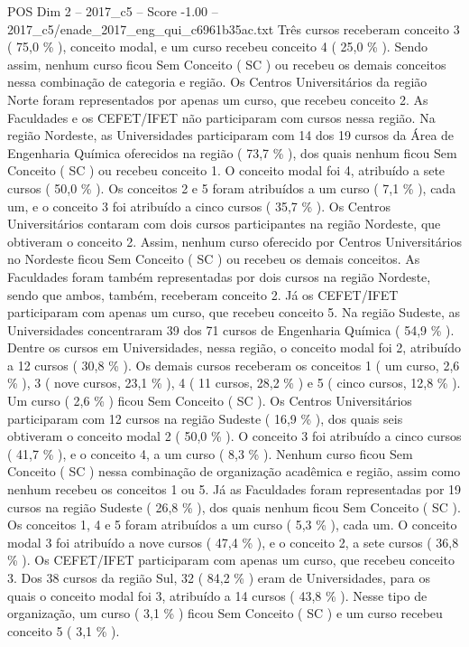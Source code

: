 \begin{textsample}{POS Dim 2 – 2017\_c5 – Score -1.00 – 2017\_c5/enade\_2017\_eng\_qui\_c6961b35ac.txt}
Três cursos receberam conceito 3 ( 75,0 \% ), conceito modal, e um curso recebeu conceito 4 ( 25,0 \% ).
Sendo assim, nenhum curso ficou Sem Conceito ( SC ) ou recebeu os demais conceitos nessa combinação de categoria e região.
Os Centros Universitários da região Norte foram representados por apenas um curso, que recebeu conceito 2.
As Faculdades e os CEFET/IFET não participaram com cursos nessa região.
Na região Nordeste, as Universidades participaram com 14 dos 19 cursos da Área de Engenharia Química oferecidos na região ( 73,7 \% ), dos quais nenhum ficou Sem Conceito ( SC ) ou recebeu conceito 1.
O conceito modal foi 4, atribuído a sete cursos ( 50,0 \% ).
Os conceitos 2 e 5 foram atribuídos a um curso ( 7,1 \% ), cada um, e o conceito 3 foi atribuído a cinco cursos ( 35,7 \% ).
Os Centros Universitários contaram com dois cursos participantes na região Nordeste, que obtiveram o conceito 2.
Assim, nenhum curso oferecido por Centros Universitários no Nordeste ficou Sem Conceito ( SC ) ou recebeu os demais conceitos.
As Faculdades foram também representadas por dois cursos na região Nordeste, sendo que ambos, também, receberam conceito 2.
Já os CEFET/IFET participaram com apenas um curso, que recebeu conceito 5.
Na região Sudeste, as Universidades concentraram 39 dos 71 cursos de Engenharia Química ( 54,9 \% ).
Dentre os cursos em Universidades, nessa região, o conceito modal foi 2, atribuído a 12 cursos ( 30,8 \% ).
Os demais cursos receberam os conceitos 1 ( um curso, 2,6 \% ), 3 ( nove cursos, 23,1 \% ), 4 ( 11 cursos, 28,2 \% ) e 5 ( cinco cursos, 12,8 \% ).
Um curso ( 2,6 \% ) ficou Sem Conceito ( SC ).
Os Centros Universitários participaram com 12 cursos na região Sudeste ( 16,9 \% ), dos quais seis obtiveram o conceito modal 2 ( 50,0 \% ).
O conceito 3 foi atribuído a cinco cursos ( 41,7 \% ), e o conceito 4, a um curso ( 8,3 \% ).
Nenhum curso ficou Sem Conceito ( SC ) nessa combinação de organização acadêmica e região, assim como nenhum recebeu os conceitos 1 ou 5.
Já as Faculdades foram representadas por 19 cursos na região Sudeste ( 26,8 \% ), dos quais nenhum ficou Sem Conceito ( SC ).
Os conceitos 1, 4 e 5 foram atribuídos a um curso ( 5,3 \% ), cada um.
O conceito modal 3 foi atribuído a nove cursos ( 47,4 \% ), e o conceito 2, a sete cursos ( 36,8 \% ).
Os CEFET/IFET participaram com apenas um curso, que recebeu conceito 3.
Dos 38 cursos da região Sul, 32 ( 84,2 \% ) eram de Universidades, para os quais o conceito modal foi 3, atribuído a 14 cursos ( 43,8 \% ).
Nesse tipo de organização, um curso ( 3,1 \% ) ficou Sem Conceito ( SC ) e um curso recebeu conceito 5 ( 3,1 \% ).

\end{textsample}
